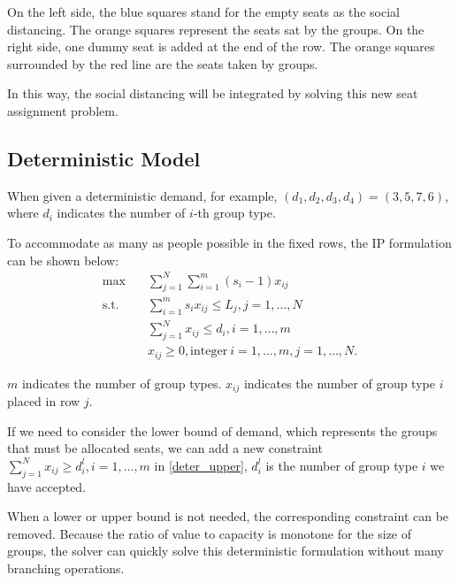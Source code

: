 On the left side, the blue squares stand for the empty seats as the social distancing. The orange squares represent the seats sat by the groups. 
On the right side, one dummy seat is added at the end of the row. The orange squares surrounded by the red line are the seats taken by groups.

In this way, the social distancing will be integrated by solving this new seat assignment problem.


\subsection{Deterministic Model}
When given a deterministic demand, for example, $(d_1, d_2, d_3, d_4) = (3,5,7,6)$, where $d_i$ indicates the number of $i$-th group type. 

To accommodate as many as people possible in the fixed rows, the IP formulation can be shown below:
\begin{equation}\label{deter_upper}
    \begin{aligned}
      \max \quad & \sum_{j =1}^{N} \sum_{i = 1}^{m} (s_i -1) x_{ij} \\
      \text {s.t.} \quad & \sum_{i = 1}^{m} s_i x_{ij} \leq L_{j}, j=1,\ldots,N \\
      & \sum_{j =1}^{N} x_{ij} \leq d_{i}, i=1,\ldots,m \\
      & x_{ij} \geq 0, \text{integer}~ i=1,\ldots,m, j=1,\ldots,N.
    \end{aligned}
\end{equation}

$m$ indicates the number of group types. $x_{ij}$ indicates the number of group type $i$ placed in row $j$.

If we need to consider the lower bound of demand, which represents the groups that must be allocated seats, we can add a new constraint $\sum_{j =1}^{N} x_{ij} \geq d_{i}^{l}, i=1,\ldots,m$ in \eqref{deter_upper}, $d_{i}^{l}$ is the number of group type $i$ we have accepted.

When a lower or upper bound is not needed, the corresponding constraint can be removed. Because the ratio of value to capacity is monotone for the size of groups, the solver can quickly solve this deterministic formulation without many branching operations.



